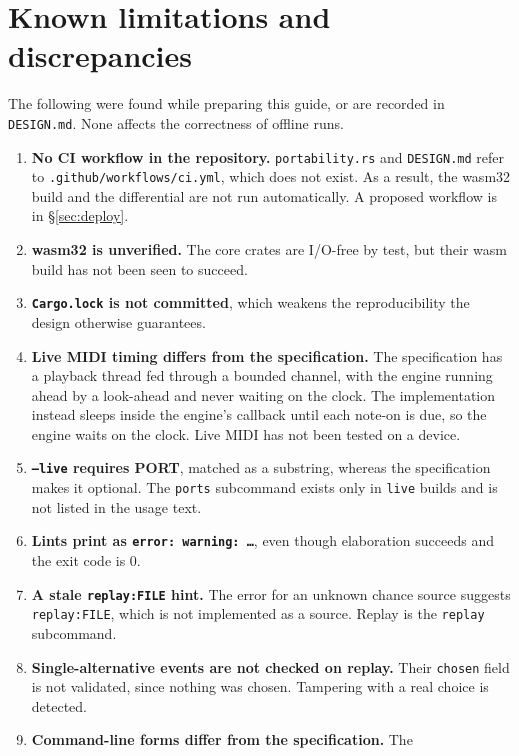 \documentclass[11pt,a4paper]{article}
\newcommand{\ttx}[1]{\texttt{#1}}
\begin{document}
\section{Known limitations and discrepancies}\label{sec:limits}

The following were found while preparing this guide, or are recorded in
\ttx{DESIGN.md}. None affects the correctness of offline runs.

\begin{enumerate}
\item \textbf{No CI workflow in the repository.} \ttx{portability.rs} and
  \ttx{DESIGN.md} refer to \ttx{.github/workflows/ci.yml}, which does not
  exist. As a result, the wasm32 build and the differential are not run
  automatically. A proposed workflow is in \S\ref{sec:deploy}.
\item \textbf{wasm32 is unverified.} The core crates are I/O-free by test,
  but their wasm build has not been seen to succeed.
\item \textbf{\ttx{Cargo.lock} is not committed}, which weakens the
  reproducibility the design otherwise guarantees.
\item \textbf{Live MIDI timing differs from the specification.} The
  specification has a playback thread fed through a bounded channel, with the
  engine running ahead by a look-ahead and never waiting on the clock. The
  implementation instead sleeps inside the engine's callback until each
  note-on is due, so the engine waits on the clock. Live MIDI has not been
  tested on a device.
\item \textbf{\ttx{--live} requires PORT}, matched as a substring, whereas the
  specification makes it optional. The \ttx{ports} subcommand exists only in
  \ttx{live} builds and is not listed in the usage text.
\item \textbf{Lints print as \ttx{error: warning: \dots}}, even though
  elaboration succeeds and the exit code is 0.
\item \textbf{A stale \ttx{replay:FILE} hint.} The error for an unknown chance
  source suggests \ttx{replay:FILE}, which is not implemented as a source.
  Replay is the \ttx{replay} subcommand.
\item \textbf{Single-alternative events are not checked on replay.} Their
  \ttx{chosen} field is not validated, since nothing was chosen. Tampering
  with a real choice is detected.
\item \textbf{Command-line forms differ from the specification.} The

\end{enumerate}
\end{document}
